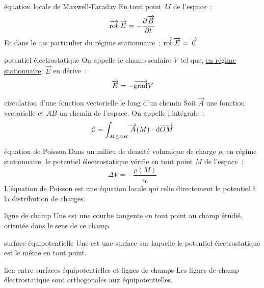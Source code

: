 

\begin{adjustwidth}{-3cm}{-3cm}


\begin{theoreme}{4.1}{équation locale de Maxwell-Faraday}
    En tout point $M$ de l'espace~:
    $$\overrightarrow{\mathrm{rot}}\, \overrightarrow{E} = - \frac{\partial^{}\overrightarrow{B}}{\partial t^{}}$$
    Et dans le cas particulier du régime stationnaire~: $\overrightarrow{\mathrm{rot}}\, \overrightarrow{E} = \overrightarrow{0}$
\end{theoreme}

\begin{definition}{4.2}{potentiel électrostatique}
    On appelle  le champ scalaire $V$ tel que, \underline{en régime stationnaire}, $\vec{E}$ en dérive~:
    $$\overrightarrow{E} = - \overrightarrow{\mathrm{grad}} V$$
\end{definition}

\begin{definition}{4.3}{circulation d'une fonction vectorielle le long d'un chemin}
    Soit $\vec{A}$ une fonction vectorielle et $AB$ un chemin de l'espace. On appelle  l'intégrale~:
    $$\mathcal{C} = \int_{M \in AB}^{}\overrightarrow{A}(M) \cdot \,\mathrm{d}\overrightarrow{OM}$$
\end{definition}

\begin{theoreme}{4.4}{équation de Poisson}
    Dans un milieu de densité volumique de charge $\rho$, en régime stationnaire, le potentiel électrostatique vérifie en tout point $M$ de l'espace~:
    $$\Delta V = - \frac{\rho(M)}{\epsilon_0}$$
    L’équation de Poisson est une équation locale qui relie directement le potentiel à la distribution de charges.
\end{theoreme}

\begin{definition}{4.5}{ligne de champ}
    Une  est une courbe tangente en tout point au champ étudié, orientée dans le sens de ce champ.
\end{definition}

\begin{definition}{4.6}{surface équipotentielle}
    Une  est une surface sur laquelle le potentiel électrostatique est le même en tout point.
\end{definition}

\begin{proposition}{4.7}{lien entre surfaces équipotentielles et lignes de champs}
    Les lignes de champ électrostatique sont orthogonales aux équipotentielles. 
\end{proposition}


\end{adjustwidth}
